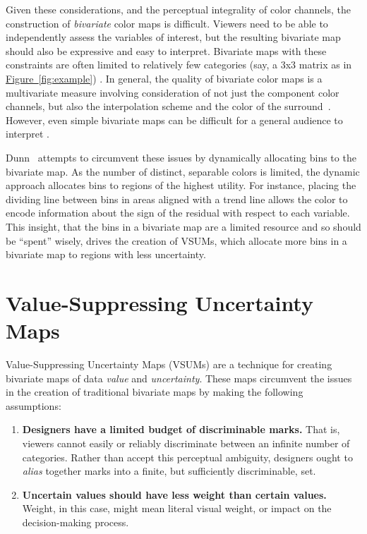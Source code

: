\documentclass{vgtc}                          %
\newcommand{\figref}[1]{\hyperref[#1]{Figure~\ref*{#1}}}
\begin{document}
Given these considerations, and the perceptual integrality of color channels, the construction of \emph{bivariate} color maps is difficult. Viewers need to be able to independently assess the variables of interest, but the resulting bivariate map should also be expressive and easy to interpret. Bivariate maps with these constraints are often limited to relatively few categories (say, a 3x3 matrix as in \figref{fig:example}) \cite{robertson1986generation,trumbo1981theory}. In general, the quality of bivariate color maps is a multivariate measure involving consideration of not just the component color channels, but also the interpolation scheme and the color of the surround~\cite{bernard2015survey}. However, even simple bivariate maps can be difficult for a general audience to interpret \cite{wainer1980empirical}.

Dunn~\cite{dunn1989dynamic} attempts to circumvent these issues by dynamically allocating bins to the bivariate map. As the number of distinct, separable colors is limited, the dynamic approach allocates bins to regions of the highest utility. For instance, placing the dividing line between bins in areas aligned with a trend line allows the color to encode information about the sign of the residual with respect to each variable. This insight, that the bins in a bivariate map are a limited resource and so should be ``spent'' wisely, drives the creation of VSUMs, which allocate more bins in a bivariate map to regions with less uncertainty.

\section{Value-Suppressing Uncertainty Maps}

Value-Suppressing Uncertainty Maps (VSUMs) are a technique for creating bivariate maps of data \emph{value} and \emph{uncertainty}. These maps circumvent the issues in the creation of traditional bivariate maps by making the following assumptions:

\begin{enumerate}
	\item \textbf{Designers have a limited budget of discriminable marks.} That is, viewers cannot easily or reliably discriminate between an infinite number of categories. Rather than accept this perceptual ambiguity, designers ought to \emph{alias} together marks into a finite, but sufficiently discriminable, set.
	\item \textbf{Uncertain values should have less weight than certain values.} Weight, in this case, might mean literal visual weight, or impact on the decision-making process.
\end{enumerate}
\end{document}
